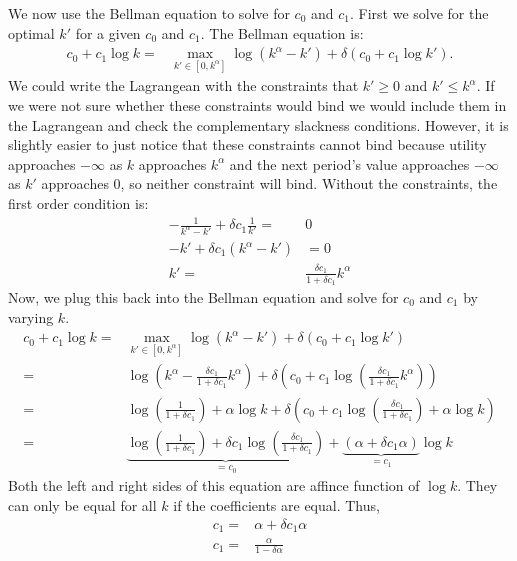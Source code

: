 \begin{example}
 We now use the Bellman equation to solve for $c_0$ and $c_1$. First
 we solve for the optimal $k'$ for a given $c_0$ and $c_1$. The
 Bellman equation is:
 \begin{align*}
   c_0 + c_1 \log k = & \max_{k' \in [0,k^\alpha]} \log(k^\alpha-k') +
   \delta\left(c_0 + c_1 \log k' \right).
 \end{align*}   
 We could write the Lagrangean with the constraints that $k'\geq 0$
 and $k'\leq k^\alpha$. If we were not sure whether these constraints
 would bind we would include them in the Lagrangean and check the
 complementary slackness conditions. However, it is slightly easier to
 just notice that these constraints cannot bind because utility
 approaches $-\infty$ as $k$ approaches $k^\alpha$ and the next
 period's value approaches $-\infty$ as $k'$ approaches $0$, so
 neither constraint will bind.  Without the constraints, the first
 order condition is:
 \begin{align*}
   -\frac{1}{k^\alpha - k'}  + \delta c_1 \frac{1}{k'} = & 0 \\
   -k' + \delta c_1 (k^\alpha - k') & = 0 \\
   k' = & \frac{\delta c_1}{1+\delta c_1} k^\alpha
 \end{align*}
 Now, we plug this back into the Bellman equation and solve for $c_0$
 and $c_1$ by varying $k$. 
 \begin{align*}
   c_0 + c_1 \log k = & \max_{k' \in [0,k^\alpha]} \log(k^\alpha-k') +
   \delta\left(c_0 + c_1 \log k' \right) \\
   = & \log\left(k^\alpha - \frac{\delta c_1}{1+\delta c_1}
     k^\alpha\right) + \delta \left(c_0 + c_1 \log \left(\frac{\delta
         c_1}{1+\delta c_1} k^\alpha\right) \right) \\
   = & \log\left(\frac{1}{1+\delta c_1}\right) + \alpha \log k +
   \delta\left(c_0 + c_1 \log\left(\frac{\delta
         c_1}{1+\delta c_1} \right) + \alpha \log k \right) \\
   = & \underbrace{\log\left(\frac{1}{1+\delta c_1}\right) + \delta
     c_1 \log\left(\frac{\delta c_1}{1+\delta c_1} \right)}_{=c_0} +
   \underbrace{(\alpha + \delta c_1 \alpha )}_{= c_1} \log k
 \end{align*}
 Both the left and right sides of this equation are affince function
 of $\log k$. They can only be equal for all $k$ if the coefficients
 are equal. Thus,
 \begin{align*} 
   c_1 = & \alpha + \delta c_1 \alpha \\
   c_1 = & \frac{\alpha}{1-\delta \alpha}

\end{align*}
\end{example}
